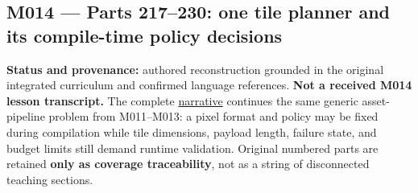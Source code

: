 \subsection{M014 --- Parts 217--230: one tile planner and its compile-time policy decisions}\label{appendix-fd090d982a15-m014-parts-217230-one-tile-planner-and-its-compile-time-policy-decisions}

\hypertarget{appendix-fd090d982a15-m014-parts-217230-one-tile-planner-and-its-compile-time-policy-decisions}{}

\textbf{Status and provenance:} authored reconstruction grounded in the original integrated curriculum and confirmed language references. \textbf{Not a received M014 lesson transcript.} The complete \hyperref[01-foundations-i-ch005-a-texture-tile-that-chooses-its-work-before-the-frame-begins]{narrative} continues the same generic asset-pipeline problem from M011--M013: a pixel format and policy may be fixed during compilation while tile dimensions, payload length, failure state, and budget limits still demand runtime validation. Original numbered parts are retained \textbf{only as coverage traceability}, not as a string of disconnected teaching sections.

